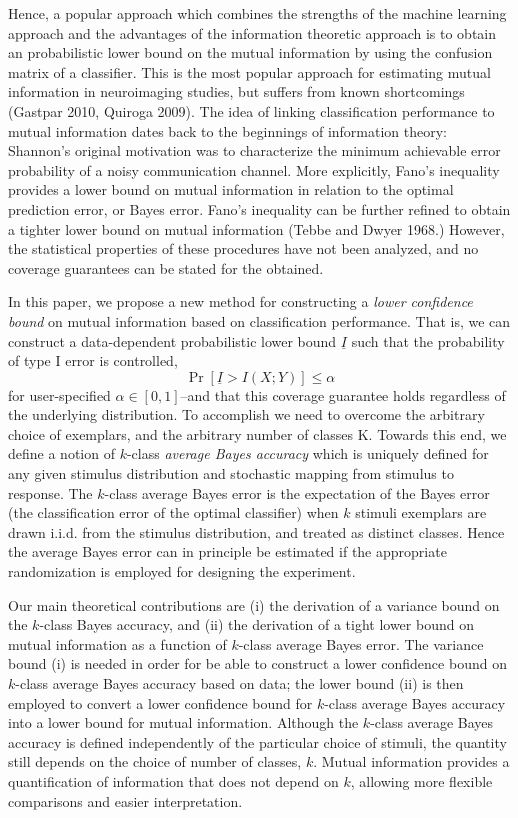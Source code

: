 \documentclass[12pt]{article}
\begin{document}
Hence, a popular approach which combines the strengths of the machine
learning approach and the advantages of the information theoretic
approach is to obtain an probabilistic lower bound on the mutual information by
using the confusion matrix of a classifier.  This is the most popular
approach for estimating mutual information in neuroimaging studies,
but suffers from known shortcomings (Gastpar 2010, Quiroga 2009).  The
idea of linking classification performance to mutual information dates
back to the beginnings of information theory: Shannon's original
motivation was to characterize the minimum achievable error
probability of a noisy communication channel.  More explicitly, Fano's
inequality provides a lower bound on mutual information in relation to
the optimal prediction error, or Bayes error.  Fano's inequality can
be further refined to obtain a tighter lower bound on mutual
information (Tebbe and Dwyer 1968.)  However, the statistical
properties of these procedures have not been analyzed, and no coverage
guarantees can be stated for the obtained.

In this paper, we propose a new method for constructing a \emph{lower
confidence bound} on mutual information based on classification
performance.  That is, we can construct a data-dependent probabilistic
lower bound $\underline{I}$ such that the probability of type I error
is controlled,
\[
\Pr[\underline{I} > I(X; Y)] \leq \alpha
\]
for user-specified $\alpha \in [0,1]$--and that this coverage
guarantee holds regardless of the underlying distribution.  To
accomplish we need to overcome the arbitrary choice of exemplars, and
the arbitrary number of classes K.  Towards this end, we define a
notion of $k$-class \emph{average Bayes accuracy} which is uniquely
defined for any given stimulus distribution and stochastic mapping
from stimulus to response.  The $k$-class average Bayes error is the
expectation of the Bayes error (the classification error of the
optimal classifier) when $k$ stimuli exemplars are drawn i.i.d. from
the stimulus distribution, and treated as distinct classes.  Hence the
average Bayes error can in principle be estimated if the appropriate
randomization is employed for designing the experiment.

Our main theoretical contributions are (i) the derivation of a
variance bound on the $k$-class Bayes accuracy, and (ii) the
derivation of a tight lower bound on mutual information as a function
of $k$-class average Bayes error.  The variance bound (i) is needed in
order for be able to construct a lower confidence bound on $k$-class
average Bayes accuracy based on data; the lower bound (ii) is then
employed to convert a lower confidence bound for $k$-class average
Bayes accuracy into a lower bound for mutual information.  Although
the $k$-class average Bayes accuracy is defined independently of the
particular choice of stimuli, the quantity still depends on the choice
of number of classes, $k$. Mutual information provides a
quantification of information that does not depend on $k$, allowing
more flexible comparisons and easier interpretation.
\end{document}
